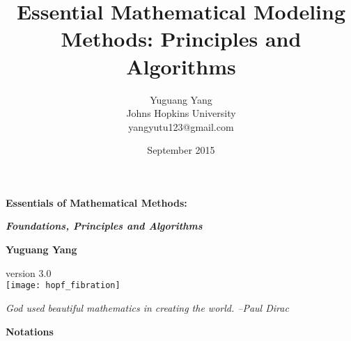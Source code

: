 \documentclass[oneside,hidelinks,12pt,letterpaper]{scrbook} %
\title{\huge \textbf{Essential Mathematical Modeling Methods: Principles and Algorithms}}
\author{Yuguang Yang \\
Johns Hopkins University \\yangyutu123@gmail.com }
\date{September 2015}
\theoremstyle{remark}
\theoremstyle{coloredRemark}
\theoremstyle{coloredNote}
\begin{document}
\sloppy


\begin{titlepage}
    \begin{center}
        \vspace*{1cm}
        
        {\huge \textbf{Essentials of Mathematical Methods:}} 
        
        \vspace{0.8cm}
        
        {\Large \textbf{\textit{Foundations, Principles and Algorithms}}}
        
        
        \vspace{1.5cm}
       {\large\textbf{Yuguang Yang}}\\
       \vspace{0.5cm}
       
       version 3.0 \\
\vspace{0.4cm}
        	\texttt{[image: hopf\_fibration]}
       \vspace{0.4cm} 
         
    {\textit{God used beautiful mathematics in creating the world. --Paul Dirac}}\\
        
    \end{center}





\end{titlepage}



\newpage

\begin{center}
	\Large
	\textbf{\huge Notations}
	
	\vspace{0.4cm}
	\large
	
	\vspace{0.4cm}
\end{center}
\end{document}
